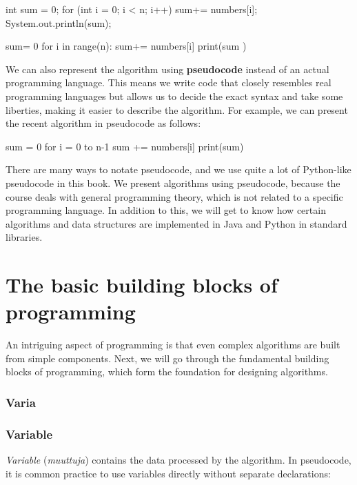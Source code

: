 \begin{code}
    int sum = 0;
    for (int i = 0; i < n; i++) {
            sum+= numbers[i];
        }
    System.out.println(sum);
\end{code}

\begin{code}
    sum= 0
    for i in range(n):
    sum+= numbers[i]
    print(sum )
\end{code}


We can also represent the algorithm using \textbf{pseudocode} instead of an actual programming language.
This means we write code that closely resembles real programming languages but allows us to decide the exact syntax and take some liberties, making it easier to describe the algorithm.
For example, we can present the recent algorithm in pseudocode as follows:

\begin{code}
    sum = 0
    for i = 0 to n-1
    sum += numbers[i]
    print(sum)
\end{code}

There are many ways to notate pseudocode, and
we use quite a lot of Python-like pseudocode in this book.
We present algorithms using pseudocode,
because the course deals with general programming theory,
which is not related to a specific programming language.
In addition to this, we will get to know how certain algorithms
and data structures are implemented in Java and Python
in standard libraries.

\section{The basic building blocks of programming}

An intriguing aspect of programming is that even complex algorithms are built from simple components.
Next, we will go through the fundamental building blocks of programming, which form the foundation for designing algorithms.

\subsubsection{Varia}

\subsubsection{Variable}

\emph{Variable} (\emph{muuttuja}) contains the data processed by the algorithm.
In pseudocode, it is common practice to use variables directly without separate declarations:


